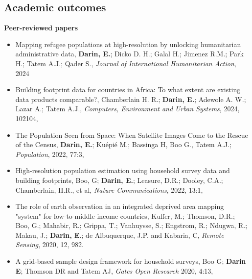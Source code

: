 \documentclass[
]{friggeri-cv}
\begin{document}
\clearpage

\begin{noside}
\section{Academic outcomes}
\textbf{Peer-reviewed papers}
\begin{itemize}
\item Mapping refugee populations at high-resolution by unlocking humanitarian administrative data, \textbf{Darin, E.}; Dicko D. H.;  Galal H.; Jimenez R.M.; Park H.;  Tatem A.J.; Qader S., \textit{Journal of International Humanitarian Action}, 2024 \href{https://doi.org/10.1186/s41018-024-00157-6}{\scriptsize{}}
\item Building footprint data for countries in Africa: To what extent are existing data products comparable?, Chamberlain H. R.; \textbf{Darin, E.}; Adewole A. W.; Lazar A.; Tatem A.J., \textit{Computers, Environment and Urban Systems}, 2024, 102104, \href{https://doi.org/10.1016/j.compenvurbsys.2024.102104}{\scriptsize{}}
\item The Population Seen from Space: When Satellite Images Come to the Rescue of the Census, \textbf{Darin, E.}; Kuépié M.; Bassinga H, Boo G., Tatem A.J.; \textit{Population}, 2022, 77:3, \href{https://doi.org/10.3917/popu.2203.0467}{\scriptsize{}}
\item High-resolution population estimation using household survey data and building footprints, Boo, G; \textbf{Darin, E.}; Leasure, D.R.; Dooley, C.A.; Chamberlain, H.R., et al, \textit{Nature Communications}, 2022, 13:1,    \href{https://www.nature.com/articles/s41467-022-29094-x}{\scriptsize{}}
\item The role of earth observation in an integrated deprived area mapping "system" for low-to-middle income countries, Kuffer, M.; Thomson, D.R.; Boo, G.; Mahabir, R.; Grippa, T.; Vanhuysse, S.; Engstrom, R.; Ndugwa, R.; Makau, J.; \textbf{Darin, E}.; de Albuquerque, J.P. and Kabaria, C, \textit{Remote Sensing}, 2020, 12, 982.    \href{https://www.mdpi.com/2072-4292/12/6/982}{\scriptsize{}} 
\item A grid-based sample design framework for household surveys, Boo G; \textbf{Darin E}; Thomson DR and Tatem AJ, \textit{Gates Open Research} 2020, 4:13, \href{https://gatesopenresearch.org/articles/4-13/v1}{\scriptsize{}}


\end{itemize}
\end{noside}
\end{document}
